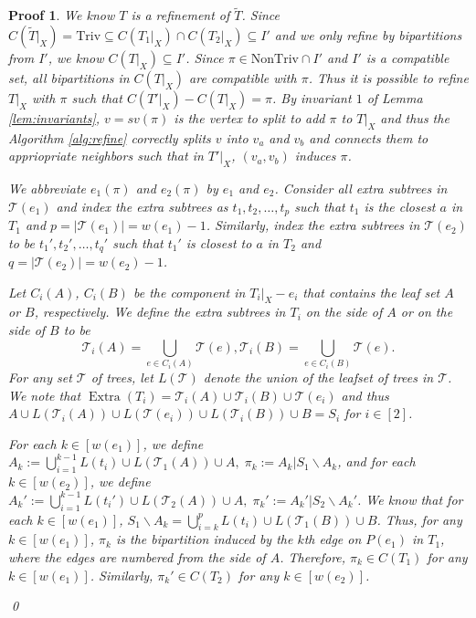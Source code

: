 \documentclass{bmcart}
\newcommand{\triv}{\mathrm{Triv}}
\newcommand{\ntriv}{\mathrm{NonTriv}}
\DeclareMathOperator*{\extra}{Extra}
\theoremstyle{mystyle}
\theoremstyle{proofstyle}
\newtheorem*{proof2}{Proof}
\newenvironment{proofnospace}{\begin{proof2}}{\qed \end{proof2}}
\begin{document}
\lemRefineAchievesWeight*
\begin{proofnospace}
    We know $T$ is a refinement of $\tilde{T}$. Since $C(\tilde{T}|_X) = \triv \subseteq C(T_1|_X) \cap C(T_2|_X) \subseteq I'$ and we only refine by bipartitions from $I'$, we know $C(T|_X) \subseteq I'$. Since $\pi \in \ntriv \cap I'$ and $I'$ is a compatible set, all bipartitions in $C(T|_X)$ are compatible with $\pi$. Thus it is possible to refine $T|_X$ with $\pi$ such that $C(T'|_X) - C(T|_X) = \pi$. By invariant $1$ of Lemma \ref{lem:invariants}, $v = sv(\pi)$ is the vertex to split to add $\pi$ to $T|_X$ and thus the Algorithm \ref{alg:refine} correctly splits $v$ into $v_a$ and $v_b$ and connects them to appriopriate neighbors such that in $T'|_X$, $(v_a,v_b)$ induces $\pi$.\smallskip

    We abbreviate $e_1(\pi)$ and $e_2(\pi)$ by $e_1$ and $e_2$.  Consider all extra subtrees in $\mathcal{T}(e_1)$ and index the extra subtrees as $t_1, t_2, \dots, t_p$ such that $t_1$ is the closest $a$ in $T_1$ and $p = |\mathcal{T}(e_1)| = w(e_1)-1$. Similarly, index the extra subtrees in $\mathcal{T}(e_2)$ to be $t_1', t_2', \dots, t_q'$ such that $t_1'$ is closest to $a$ in $T_2$ and $q = |\mathcal{T}(e_2)| = w(e_2)-1$. \smallskip

    Let $C_i(A)$, $C_i(B)$ be the component in $T_i|_X - e_i$ that contains the leaf set $A$ or $B$, respectively. We define the extra subtrees in $T_i$ on the side of $A$ or on the side of $B$ to be \[\mathcal{T}_i(A) = \bigcup_{e \in C_i(A)} \mathcal{T}(e), \mathcal{T}_i(B) = \bigcup_{e \in C_i(B)} \mathcal{T}(e). \]
    For any set $\mathcal{T}$ of trees, let $L(\mathcal{T})$ denote the union of the leafset of trees in $\mathcal{T}$. We note that $\extra(T_i) = \mathcal{T}_i(A) \cup \mathcal{T}_i(B) \cup \mathcal{T}(e_i)$ and thus $A \cup L(\mathcal{T}_i(A)) \cup L(\mathcal{T}(e_i)) \cup L(\mathcal{T}_i(B)) \cup B = S_i$ for $i \in [2]$. \smallskip

    For each $k \in [w(e_1)]$, we define
    $A_k := \bigcup_{i = 1}^{k-1} L(t_i) \cup L(\mathcal{T}_1(A)) \cup A,\; \pi_k := A_k | S_1 \backslash A_k$, and for each $k \in [w(e_2)]$, we define
    $A_k' := \bigcup_{i = 1}^{k-1} L(t_i') \cup L(\mathcal{T}_2(A)) \cup A,\; \pi_k' := A_k' | S_2 \backslash A_k'$.
    We know that for each $k \in [w(e_1)]$, $S_1 \backslash A_k = \bigcup_{i = k}^{p} L(t_i) \cup L(\mathcal{T}_1(B)) \cup B$. Thus, for any $k \in [w(e_1)]$, $\pi_k$ is the bipartition induced by the $k$th edge on $P(e_1)$ in $T_1$, where the edges are numbered from the side of $A$. Therefore, $\pi_k \in C(T_1)$ for any $k \in [w(e_1)]$. Similarly, $\pi_k' \in C(T_2)$  for any $k \in [w(e_2)]$. \smallskip


\end{proofnospace}
\end{document}
